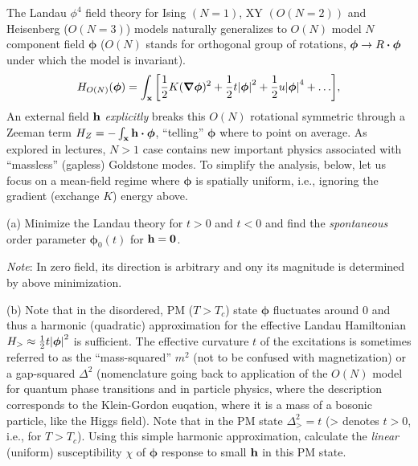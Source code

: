 \documentclass[12pt]{article}
\begin{document}
\begin{problem}{4}

The Landau $\phi^4$ field theory for Ising $(N=1)$, XY $(O(N=2))$ and 
Heisenberg ($O(N=3)$) models naturally generalizes to $O(N)$ model $N$ component
field $\bm\phi$ ($O(N)$ stands for orthogonal group of rotations, $\bm\phi\to
R\vdot\bm\phi$ under which the model is invariant).
\begin{equation}
    H_{O(N)}(\bm\phi)=\int_{\vb{x}}\qty[\frac12K(\grad\bm\phi)^2+\frac12t\abs{\bm\phi}^2+\frac12u\abs{\bm\phi}^4+\hdots], 
\end{equation}
An external field $\vb{h}$ \textit{explicitly} breaks this $O(N)$ rotational
symmetric through a Zeeman term $H_Z=-\int_{\vb{x}}\vb{h}\vdot\bm\phi$,
``telling'' $\bm\phi$ where to point on average. As explored in lectures, $N>1$
case contains new important physics associated with ``massless'' (gapless)
Goldstone modes. To simplify the analysis, below, let us focus on a mean-field
regime where $\bm\phi$ is spatially uniform, i.e., ignoring the gradient
(exchange $K$) energy above.

(a) Minimize the Landau theory for $t>0$ and $t<0$ and find the
\textit{spontaneous} order parameter $\bm\phi_0(t)$ for $\vb{h}=\vb{0}$.

\textit{Note}: In zero field, its direction is arbitrary and ony its magnitude
is determined by above minimization.

(b) Note that in the disordered, PM ($T>T_c$) state $\bm\phi$ fluctuates around
0 and thus a harmonic (quadratic) approximation for the effective Landau
Hamiltonian $H_>\approx\frac12 t\abs{\bm\phi}^2$ is sufficient. The effective
curvature $t$ of the excitations is sometimes referred to as the
``mass-squared'' $m^2$ (not to be confused with magnetization) or a gap-squared
$\Delta^2$ (nomenclature going back to application of the $O(N)$ model for
quantum phase transitions and in particle physics, where the description
corresponds to the Klein-Gordon euqation, where it is a mass of a bosonic
particle, like the Higgs field). Note that in the PM state $\Delta_>^2=t$ (>
denotes $t>0$, i.e., for $T>T_c$). Using this simple harmonic approximation,
calculate the \textit{linear} (uniform) susceptibility $\chi$ of $\bm\phi$
response to small $\vb{h}$ in this PM state.


\end{problem}
\end{document}
